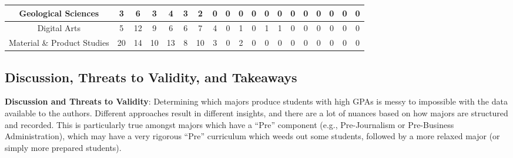 \documentclass[10]{article}
\begin{document}
\begin{landscape}
\begin{longtable}[c]{|ccccccccccccccccccc|}
	\multicolumn{1}{|c|}{Geological Sciences}                        & \multicolumn{1}{c|}{3}          & \multicolumn{1}{c|}{6}          & \multicolumn{1}{c|}{3}          & \multicolumn{1}{c|}{4}          & \multicolumn{1}{c|}{3}          & \multicolumn{1}{c|}{2}          & \multicolumn{1}{c|}{0}          & \multicolumn{1}{c|}{0}          & \multicolumn{1}{c|}{0}          & \multicolumn{1}{c|}{0}          & \multicolumn{1}{c|}{0}          & \multicolumn{1}{c|}{0}          & \multicolumn{1}{c|}{0}          & \multicolumn{1}{c|}{0}          & \multicolumn{1}{c|}{0}          & \multicolumn{1}{c|}{0}          & \multicolumn{1}{c|}{0}          & 0          \\ \hline
	\multicolumn{1}{|c|}{Digital Arts}                               & \multicolumn{1}{c|}{5}          & \multicolumn{1}{c|}{12}         & \multicolumn{1}{c|}{9}          & \multicolumn{1}{c|}{6}          & \multicolumn{1}{c|}{6}          & \multicolumn{1}{c|}{7}          & \multicolumn{1}{c|}{4}          & \multicolumn{1}{c|}{0}          & \multicolumn{1}{c|}{1}          & \multicolumn{1}{c|}{0}          & \multicolumn{1}{c|}{1}          & \multicolumn{1}{c|}{1}          & \multicolumn{1}{c|}{0}          & \multicolumn{1}{c|}{0}          & \multicolumn{1}{c|}{0}          & \multicolumn{1}{c|}{0}          & \multicolumn{1}{c|}{0}          & 0          \\ \hline
	\multicolumn{1}{|c|}{Material \& Product Studies}                & \multicolumn{1}{c|}{20}         & \multicolumn{1}{c|}{14}         & \multicolumn{1}{c|}{10}         & \multicolumn{1}{c|}{13}         & \multicolumn{1}{c|}{8}          & \multicolumn{1}{c|}{10}         & \multicolumn{1}{c|}{3}          & \multicolumn{1}{c|}{0}          & \multicolumn{1}{c|}{2}          & \multicolumn{1}{c|}{0}          & \multicolumn{1}{c|}{0}          & \multicolumn{1}{c|}{0}          & \multicolumn{1}{c|}{0}          & \multicolumn{1}{c|}{0}          & \multicolumn{1}{c|}{0}          & \multicolumn{1}{c|}{0}          & \multicolumn{1}{c|}{0}          & 0          \\ \hline
\end{longtable}

\end{landscape}

\normalsize
\subsection{Discussion, Threats to Validity, and Takeaways}

\textbf{Discussion and Threats to Validity}: Determining which majors produce students with high GPAs is messy to impossible with the data available to the authors. Different approaches result in different insights, and there are a lot of nuances based on how majors are structured and recorded. This is  particularly true amongst majors which have a ``Pre'' component (e.g., Pre-Journalism or Pre-Business Administration), which may have a very rigorous ``Pre'' curriculum which weeds out some students, followed by a more relaxed major (or simply more prepared students).
\end{document}

